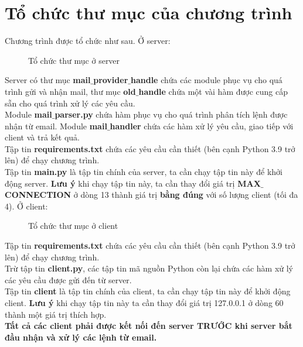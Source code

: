 \section{Tổ chức thư mục của chương trình}
Chương trình được tổ chức như sau.
Ở server:
\begin{figure}[H]
\caption{Tổ chức thư mục ở server}
\end{figure}
Server có thư mục \textbf{mail$\mathbf{\_}$provider$\mathbf{\_}$handle} chứa các module phục vụ cho quá trình gửi và nhận mail, thư mục \textbf{old$\mathbf{\_}$handle} chứa một vài hàm được cung cấp sẵn cho quá trình xử lý các yêu cầu. \\
Module \textbf{mail$\mathbf{\_}$parser.py} chứa hàm phục vụ cho quá trình phân tích lệnh được nhận từ email. Module \textbf{mail$\mathbf{\_}$handler} chứa các hàm xử lý yêu cầu, giao tiếp với client và trả kết quả. \\
Tập tin \textbf{requirements.txt} chứa các yêu cầu cần thiết (bên cạnh Python 3.9 trở lên) để chạy chương trình.\\
Tập tin \textbf{main.py} là tập tin chính của server, ta cần chạy tập tin này để khởi động server. \textbf{Lưu ý} khi chạy tập tin này, ta cần thay đổi giá trị \textbf{MAX$\mathbf{\_}$CONNECTION} ở dòng 13 thành giá trị \textbf{bằng đúng} với số lượng client (tối đa 4).
Ở client:
\begin{figure}[H]
\caption{Tổ chức thư mục ở client}
\end{figure}
Tập tin \textbf{requirements.txt} chứa các yêu cầu cần thiết (bên cạnh Python 3.9 trở lên) để chạy chương trình.\\
Trừ tập tin \textbf{client.py}, các tập tin mã nguồn Python còn lại chứa các hàm xử lý các yêu cầu được gửi đến từ server.\\
Tập tin \textbf{client} là tập tin chính của client, ta cần chạy tập tin này để khởi động client. \textbf{Lưu ý} khi chạy tập tin này ta cần thay đổi giá trị 127.0.0.1 ở dòng 60 thành một giá trị thích hợp.\\
\textbf{Tất cả các client phải được kết nối đến server TRƯỚC khi server bắt đầu nhận và xử lý các lệnh từ email.}


